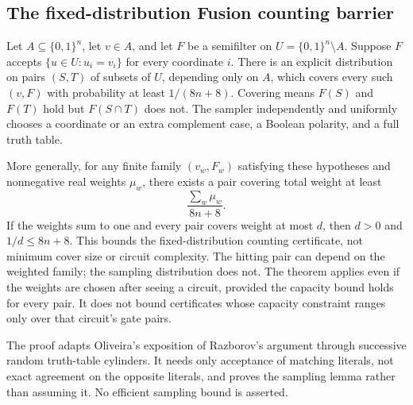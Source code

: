 \begin{result}
\subsection{The fixed-distribution Fusion counting barrier}
Let $A\subseteq\{0,1\}^n$, let $v\in A$, and let $F$ be a semifilter on
$U=\{0,1\}^n\setminus A$. Suppose $F$ accepts
$\{u\in U:u_i=v_i\}$ for every coordinate $i$.
There is an explicit distribution on pairs $(S,T)$ of subsets of $U$, depending
only on $A$, which covers every such $(v,F)$ with probability at least
$1/(8n+8)$. Covering means $F(S)$ and $F(T)$ hold but $F(S\cap T)$ does not.
The sampler independently and uniformly chooses a coordinate or an extra
complement case, a Boolean polarity, and a full truth table.

More generally, for any finite family $(v_w,F_w)$ satisfying these hypotheses
and nonnegative real weights $\mu_w$, there exists a pair covering total weight
at least
\[
\frac{\sum_w\mu_w}{8n+8}.
\]
If the weights sum to one and every pair covers weight at most $d$, then
$d>0$ and $1/d\le8n+8$. This bounds the fixed-distribution counting certificate,
not minimum cover size or circuit complexity. The hitting pair can depend on
the weighted family; the sampling distribution does not. The theorem applies even
if the weights are chosen after seeing a circuit, provided the capacity bound
holds for every pair. It does not bound certificates whose capacity constraint
ranges only over that circuit's gate pairs.

The proof adapts Oliveira's exposition of Razborov's argument through successive
random truth-table cylinders. It needs only acceptance of matching literals,
not exact agreement on the opposite literals, and proves the sampling lemma
rather than assuming it. No efficient sampling bound is asserted.
\citep{Oliveira2018Approximation,Razborov1989}
\end{result}

